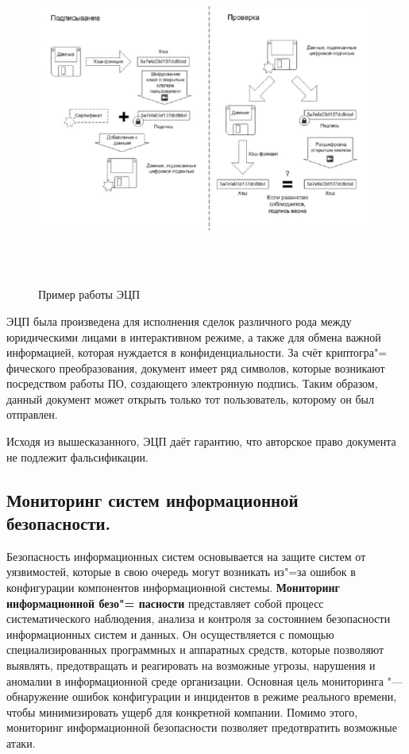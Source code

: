     \begin{figure}[H]
        \centering
        \includegraphics[height = 11cm, width = 14cm]{pic/legit_doc.png}
        \caption{Пример работы ЭЦП}
    \end{figure}

    ЭЦП была произведена для исполнения сделок различного рода между юридическими лицами в интерактивном режиме,
    а также для обмена важной информацией, которая нуждается в конфиденциальности. За счёт криптогра"=
    фического преобразования,
    документ имеет ряд символов, которые возникают посредством работы ПО, создающего электронную подпись. Таким образом, данный документ
    может открыть только тот пользователь, которому он был отправлен.

    Исходя из вышесказанного, ЭЦП даёт гарантию, что авторское право документа не подлежит фальсификации.\cite{crypto}

\newpage
\subsection{Мониторинг систем информационной безопасности.}
    Безопасность информационных систем основывается на защите систем от уязвимостей, которые в свою очередь могут возникать из"=за
    ошибок в конфигурации компонентов информационной системы. \textbf{Мониторинг информационной безо"=
    пасности} представляет собой процесс систематического 
    наблюдения, анализа и контроля за состоянием безопасности информационных систем и данных. Он осуществляется с помощью специализированных программных и 
    аппаратных средств, которые позволяют выявлять, предотвращать и реагировать на возможные угрозы, нарушения и аномалии в информационной среде организации.
    Основная цель мониторинга "--- обнаружение ошибок конфигурации и инцидентов в режиме реального времени, чтобы минимизировать ущерб для конкретной компании.
    Помимо этого, мониторинг информационной безопасности позволяет предотвратить возможные атаки.

